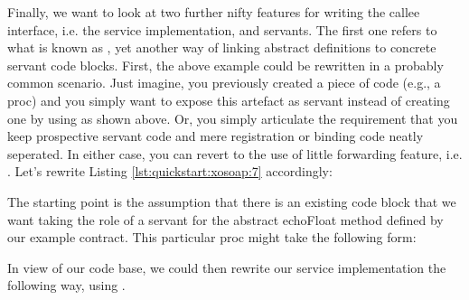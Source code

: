   Finally, we want to look at two further nifty features for writing
  the callee interface, i.e. the service implementation, and
  servants. The first one refers to what is known as
  , yet another way of linking abstract
  definitions to concrete servant code blocks. First, the above example
  could be rewritten in a probably common scenario. Just imagine, you
  previously created a piece of code (e.g., a proc) and you simply want
  to expose this artefact as servant instead of creating one by using
   as shown above.  Or, you simply articulate
  the requirement that you keep prospective servant code and mere
  registration or binding code neatly seperated. In either case, you can
  revert to the use of little forwarding feature,
  i.e. . Let's rewrite Listing
  \ref{lst:quickstart:xosoap:7} accordingly:
  
  The starting point is the assumption that there is an existing code
  block that we want taking the role of a servant for the abstract
  echoFloat method defined by our example contract. This particular proc
  might take the following form:
  \lstset{breaklines=true,numbers=left,basicstyle=\footnotesize,frame=single}
  
  
  In view of our code base, we could then rewrite our service
implementation the following way, using .
  


